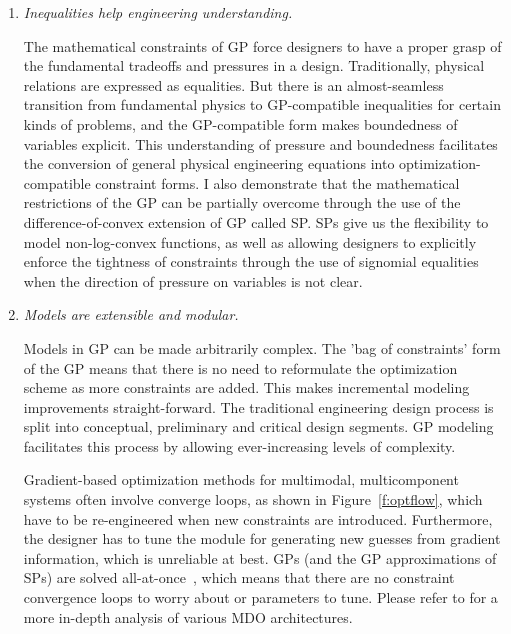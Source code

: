 \begin{enumerate}

    \item \textit{Inequalities help engineering understanding.}

    The mathematical constraints of \gls{GP} force designers to have a proper grasp
    of the fundamental tradeoffs and pressures in a design.
    Traditionally, physical relations are expressed as equalities. But there is an
    almost-seamless transition from fundamental physics to GP-compatible
    inequalities for certain kinds of problems, and the \gls{GP}-compatible
    form makes boundedness of variables explicit. This understanding of pressure
    and boundedness facilitates the conversion of general physical engineering
    equations into optimization-compatible constraint forms.
    I also demonstrate that the mathematical restrictions of the \gls{GP} can be partially
    overcome through the use of the difference-of-convex
    extension of \gls{GP} called \gls{SP}. \gls{SP}s give us the flexibility to model
    non-log-convex functions, as well as allowing designers to explicitly enforce
    the tightness of
    constraints through the use of signomial equalities when the direction of pressure
    on variables is not clear.

    \item \textit{Models are extensible and modular.}

    Models in \gls{GP} can be made arbitrarily complex. The 'bag of constraints' form of the \gls{GP}
    means that there is no need to reformulate the optimization scheme as more
    constraints are added. This makes incremental modeling improvements straight-forward.
    The traditional engineering design process is split into conceptual, preliminary
    and critical design segments. \gls{GP} modeling facilitates this process by allowing
    ever-increasing levels of complexity.

    Gradient-based optimization methods for
    multimodal, multicomponent systems often involve
    converge loops, as shown in Figure~\ref{f:optflow}, which have to be re-engineered
    when new constraints are introduced. Furthermore, the designer has to tune
    the module for generating new guesses from gradient information, which is unreliable
    at best. \gls{GP}s (and the \gls{GP} approximations
    of \gls{SP}s) are solved all-at-once~\cite{martins_mdo}, which means that there are no constraint
    convergence loops to worry about or parameters to tune. Please refer to \cite{martins_mdo}
    for a more in-depth analysis of various \gls{MDO} architectures.


\end{enumerate}
